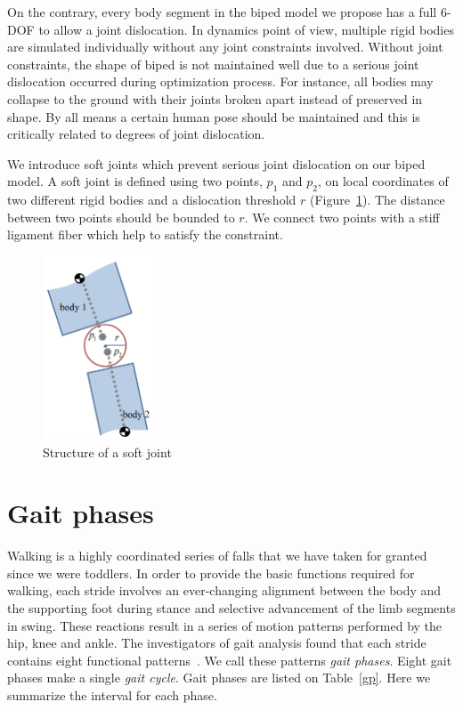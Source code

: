 \documentclass[master,english,final]{kaist-ucs}
\begin{document}
On the contrary, every body segment in the biped model we propose has a full 6-DOF
to allow a joint dislocation.
In dynamics point of view, multiple rigid bodies are simulated individually
without any joint constraints involved.
Without joint constraints, the shape of biped is not maintained well
due to a serious joint dislocation occurred during optimization process.
For instance, all bodies may collapse to the ground with their joints broken apart
instead of preserved in shape.
By all means a certain human pose should be maintained and this is critically
related to degrees of joint dislocation.

We introduce soft joints which prevent serious joint dislocation on our biped model.
A soft joint is defined using two points, $p_1$ and $p_2$, on local coordinates of two
different rigid bodies and a dislocation threshold $r$ (Figure~\ref{fig:softjoint}).
The distance between two points should be bounded to $r$.
We connect two points with a stiff ligament fiber which help to satisfy the constraint.


\begin{figure}[h!]
  \centering
  \includegraphics[width=1.3in]{softjoint}
  \caption{Structure of a soft joint}
  \label{fig:softjoint}
\end{figure}




\section{Gait phases}

Walking is a highly coordinated series of falls that we have taken for granted since we were toddlers.
In order to provide the basic functions required for walking, each stride
involves an ever-changing alignment between the body and the supporting foot during stance
and selective advancement of the limb segments in swing.
These reactions result in a series of motion patterns performed by the hip, knee and ankle.
The investigators of gait analysis found that each stride contains eight functional patterns~\cite{perry}.
We call these patterns \textit{gait phases}. Eight gait phases make a single \textit{gait cycle}.
Gait phases are listed on Table~\ref{gp}. Here we summarize the interval for each phase.
\end{document}

